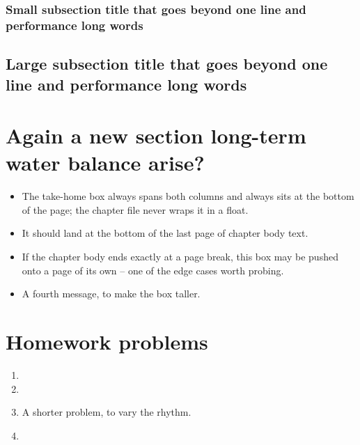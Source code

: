 \lipsum[3-5]

\subsubsection{Small subsection title that goes beyond one line and performance long words}

\lipsum[3-5]

\subsection{Large subsection title that goes beyond one line and performance long words}

\lipsum[3-10]


\lipsum[3-15]

\section{Again a new section long-term water balance arise?}

\lipsum[3-7]

\begin{boxmessages}
\begin{itemize}
\item The take-home box always spans both columns and always sits at the
      bottom of the page; the chapter file never wraps it in a float.
\item It should land at the bottom of the last page of chapter body text.
\item If the chapter body ends exactly at a page break, this box may be
      pushed onto a page of its own -- one of the edge cases worth probing.
\item A fourth message, to make the box taller.
\end{itemize}
\end{boxmessages}

\chapterhardbreak
\section*{Homework problems}

\begin{enumerate}
\item \lipsum[46]
\item \lipsum[47]
\item A shorter problem, to vary the rhythm.
\item \lipsum[48]
\end{enumerate}